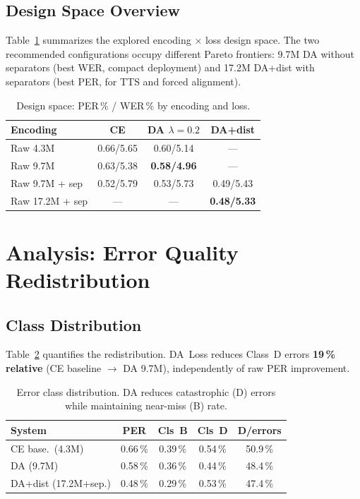 \documentclass[conference]{IEEEtran}
\newcommand{\lam}{\lambda}                %
\begin{document}
\subsection{Design Space Overview}

Table~\ref{tab:designspace} summarizes the explored encoding
$\times$ loss design space.
The two recommended configurations occupy different Pareto frontiers:
9.7M DA without separators (best WER, compact deployment) and
17.2M DA+dist with separators (best PER, for TTS and forced
alignment).

\begin{table}[ht]
  \caption{Design space: PER\,\% / WER\,\% by encoding and loss.}
  \label{tab:designspace}
  \centering\small
  \begin{tabular}{lccc}
    \toprule
    Encoding & CE & DA $\lam\!=\!0.2$ & DA+dist \\
    \midrule
    Raw 4.3M        & 0.66/5.65 & 0.60/5.14 & --- \\
    Raw 9.7M        & 0.63/5.38 & \textbf{0.58/4.96} & --- \\
    Raw 9.7M + sep  & 0.52/5.79 & 0.53/5.73 & 0.49/5.43 \\
    Raw 17.2M + sep & ---       & ---       & \textbf{0.48/5.33} \\
    \bottomrule
  \end{tabular}
\end{table}

\section{Analysis: Error Quality Redistribution}
\label{sec:analysis}

\subsection{Class Distribution}

Table~\ref{tab:classdist} quantifies the redistribution.
DA~Loss reduces Class~D errors \textbf{19\,\% relative}
(CE baseline $\to$ DA 9.7M), independently of raw PER improvement.
\begin{table}[ht]
  \caption{Error class distribution. DA reduces catastrophic (D)
           errors while maintaining near-miss (B) rate.}
  \label{tab:classdist}
  \centering\small
  \begin{tabular}{lcccc}
    \toprule
    System & PER & Cls~B & Cls~D & D/errors \\
    \midrule
    CE base.\ (4.3M)         & 0.66\,\% & 0.39\,\% & 0.54\,\% & 50.9\,\% \\
    DA (9.7M)                & 0.58\,\% & 0.36\,\% & 0.44\,\% & 48.4\,\% \\
    DA+dist (17.2M+sep.)     & 0.48\,\% & 0.29\,\% & 0.53\,\% & 47.4\,\% \\
    \bottomrule
  \end{tabular}
\end{table}
\end{document}
